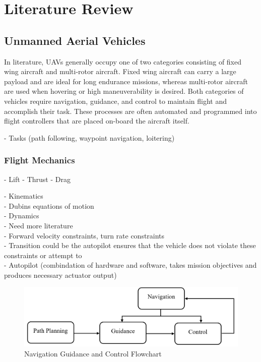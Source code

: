 \documentclass[numbered,pdftex]{ohio-etd}
\begin{document}
\chapter{Literature Review}
\section{Unmanned Aerial Vehicles}

In literature, UAVs generally occupy one of two categories consisting of fixed wing aircraft and multi-rotor aircraft. Fixed wing aircraft can carry a large payload and are ideal for long endurance missions, whereas multi-rotor aircraft are used when hovering or high maneuverability is desired. Both categories of vehicles require navigation, guidance, and control to maintain flight and accomplish their task. These processes are often automated and programmed into flight controllers that are placed on-board the aircraft itself. 

 - Tasks (path following, waypoint navigation, loitering)

\subsection{Flight Mechanics}

- Lift
- Thrust
- Drag

- Kinematics \\
- Dubins equations of motion \\
- Dynamics \\
- Need more literature \\

- Forward velocity constraints, turn rate constraints \\
- Transition could be the autopilot ensures that the vehicle does not violate these constraints or attempt to \\
- Autopilot (combindation of hardware and software, takes mission objectives and produces necessary actuator output)


\begin{figure}[h]
	\centering
	\includegraphics[width=0.7\linewidth]{PaperFigures/ngcFlow}
	\caption{Navigation Guidance and Control Flowchart}
	\label{fig:ngcflow}
\end{figure}
\end{document}
